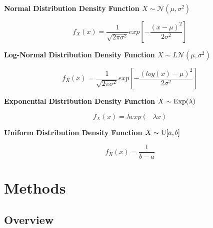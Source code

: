 \documentclass[12pt]{article}
\begin{document}
            \textbf{Normal Distribution Density Function  $ X \sim \mathcal{N}(\mu, \sigma^2)  $}
               
            \begin{Large} 

                \[ f_X(x) = \frac{1}{\sqrt{2\pi \sigma^2}} exp\left[{-\frac{(x - \mu)^2}{2 \sigma^2}}\right] \] 

            \end{Large}

            \textbf{Log-Normal Distribution Density Function  $ X \sim L\mathcal{N}(\mu, \sigma^2) $}

            \begin{Large} 

                \[ f_X(x) = \frac{1}{\sqrt{2\pi \sigma^2}} exp\left[{-\frac{(log(x) - \mu)^2}{2 \sigma^2}}\right] \] 

            \end{Large}

            \textbf{Exponential Distribution Density Function  $ X \sim \textnormal{Exp}(\lambda) $}

            \begin{Large} 

                \[ f_X(x) = \lambda exp(- \lambda x) \] 

            \end{Large}
            
            \textbf{Uniform Distribution Density Function  $ X \sim \textnormal{U}[a, b] $}
            
            \begin{Large} 

                \[ f_X(x) = \frac{1}{b - a} \] 

            \end{Large}

    \newpage \section{Methods}

        \subsection{Overview}
\end{document}
